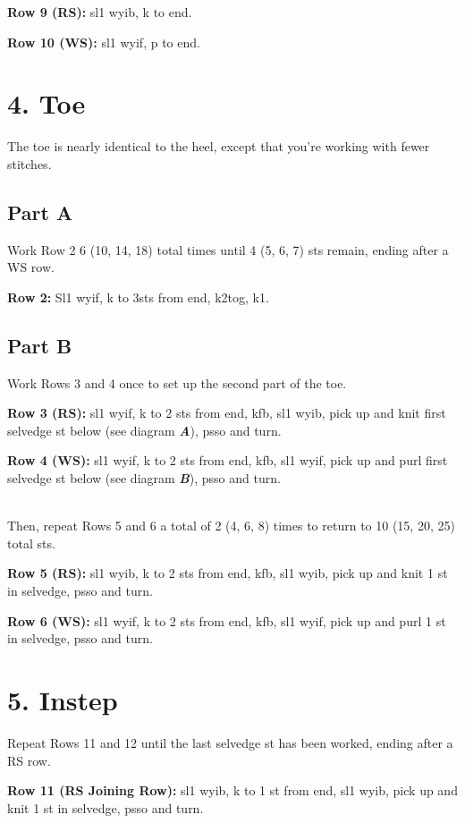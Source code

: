 \documentclass[12pt]{article}
\newcommand{\vocab}[1]{\emph{\textbf{#1}}} %
\newcommand{\rowDir}[1]{\textbf{#1:}} %
\begin{document}
\rowDir{Row 9 (RS)} sl1 wyib, k to end.

\rowDir{Row 10 (WS)} sl1 wyif, p to end.

\pagebreak
\section*{4. Toe}

The toe is nearly identical to the heel, except that you're working with fewer stitches.

\subsection*{Part A}
Work Row 2 6 (10, 14, 18) total times until 4 (5, 6, 7) sts remain, ending after a WS row.

\rowDir{Row 2} Sl1 wyif, k to 3sts from end, k2tog, k1.

\subsection*{Part B}
Work Rows 3 and 4 once to set up the second part of the toe.

\rowDir{Row 3 (RS)}  sl1 wyif, k to 2 sts from end, kfb, sl1 wyib, pick up and knit first selvedge st below (see diagram \vocab{A}), psso and turn.

\rowDir{Row 4 (WS)} sl1 wyif, k to 2 sts from end, kfb, sl1 wyif, pick up and purl first selvedge st below (see diagram \vocab{B}), psso and turn.

~\\
Then, repeat Rows 5 and 6 a total of 2 (4, 6, 8) times to return to 10 (15, 20, 25) total sts.

\rowDir{Row 5 (RS)} sl1 wyib, k to 2 sts from end, kfb, sl1 wyib, pick up and knit 1 st in selvedge, psso and turn.

\rowDir{Row 6 (WS)} sl1 wyif, k to 2 sts from end, kfb, sl1 wyif, pick up and purl 1 st in selvedge, psso and turn.

\section*{5. Instep}

Repeat Rows 11 and 12 until the last selvedge st has been worked, ending after a RS row.

\rowDir{Row 11 (RS Joining Row)} sl1 wyib, k to 1 st from end, sl1 wyib, pick up and knit 1 st in selvedge, psso and turn.
\end{document}
